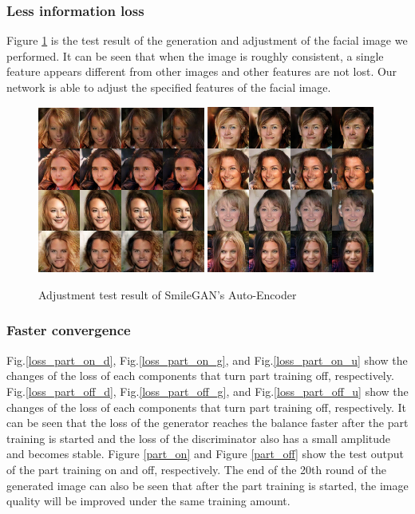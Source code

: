 \subsubsection*{Less information loss}
Figure \ref{adjust} is the test result of the generation and adjustment of the facial image we performed.
It can be seen that when the image is roughly consistent, a single feature appears different from other images and other features are not lost.
Our network is able to adjust the specified features of the facial image.

\begin{figure}
    \begin{center}
    \includegraphics[width=0.49\textwidth]{figures/result_adjust_1.png}
    \includegraphics[width=0.49\textwidth]{figures/result_adjust_2.png}
    \caption{Adjustment test result of SmileGAN's Auto-Encoder}
    \label{adjust}
    \end{center}
\end{figure}

\subsubsection*{Faster convergence}
Fig.\ref{loss_part_on_d}, Fig.\ref{loss_part_on_g}, and Fig.\ref{loss_part_on_u} show the changes of the loss of each components that turn part training off, respectively.
Fig.\ref{loss_part_off_d}, Fig.\ref{loss_part_off_g}, and Fig.\ref{loss_part_off_u} show the changes of the loss of each components that turn part training off, respectively.
It can be seen that the loss of the generator reaches the balance faster after the part training is started and the loss of the discriminator also has a small amplitude and becomes stable.
Figure \ref{part_on} and Figure \ref{part_off} show the test output of the part training on and off, respectively.
The end of the 20th round of the generated image can also be seen that after the part training is started, the image quality will be improved under the same training amount.

